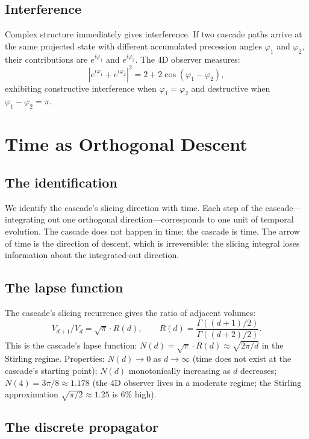 \documentclass[12pt,a4paper]{article}
\begin{document}
\subsection{Interference}

Complex structure immediately gives interference. If two cascade paths arrive at the same
projected state with different accumulated precession angles $\varphi_1$ and $\varphi_2$,
their contributions are $e^{i\varphi_1}$ and $e^{i\varphi_2}$. The 4D observer measures:
\[
|e^{i\varphi_1}+e^{i\varphi_2}|^2 = 2+2\cos(\varphi_1-\varphi_2),
\]
exhibiting constructive interference when $\varphi_1=\varphi_2$ and destructive when
$\varphi_1-\varphi_2=\pi$.

\section{Time as Orthogonal Descent}

\subsection{The identification}

We identify the cascade's slicing direction with time. Each step of the cascade---integrating
out one orthogonal direction---corresponds to one unit of temporal evolution. The cascade
does not happen in time; the cascade is time. The arrow of time is the direction of descent,
which is irreversible: the slicing integral loses information about the integrated-out
direction.

\subsection{The lapse function}

The cascade's slicing recurrence gives the ratio of adjacent volumes:
\[
V_{d+1}/V_d = \sqrt{\pi}\cdot R(d),\qquad R(d) = \frac{\Gamma((d+1)/2)}{\Gamma((d+2)/2)}.
\]
This is the cascade's lapse function: $N(d)=\sqrt{\pi}\cdot R(d)\approx\sqrt{2\pi/d}$ in
the Stirling regime. Properties: $N(d)\to 0$ as $d\to\infty$ (time does not exist at the
cascade's starting point); $N(d)$ monotonically increasing as $d$ decreases; $N(4)=3\pi/8
\approx 1.178$ (the 4D observer lives in a moderate regime; the Stirling approximation
$\sqrt{\pi/2}\approx 1.25$ is 6\% high).

\subsection{The discrete propagator}
\end{document}

